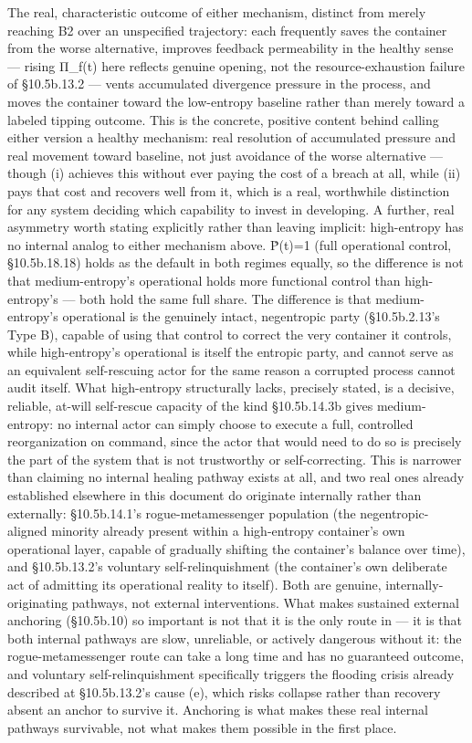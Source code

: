 \documentclass[
]{article}
\begin{document}
The real, characteristic outcome of either mechanism, distinct from
merely reaching B2 over an unspecified trajectory: each frequently saves
the container from the worse alternative, improves feedback permeability
in the healthy sense --- rising Π\_f(t) here reflects genuine opening,
not the resource-exhaustion failure of §10.5b.13.2 --- vents accumulated
divergence pressure in the process, and moves the container toward the
low-entropy baseline rather than merely toward a labeled tipping
outcome. This is the concrete, positive content behind calling either
version a healthy mechanism: real resolution of accumulated pressure and
real movement toward baseline, not just avoidance of the worse
alternative --- though (i) achieves this without ever paying the cost of
a breach at all, while (ii) pays that cost and recovers well from it,
which is a real, worthwhile distinction for any system deciding which
capability to invest in developing. A further, real asymmetry worth
stating explicitly rather than leaving implicit: high-entropy has no
internal analog to either mechanism above. Ṗ(t)=1 (full operational
control, §10.5b.18.18) holds as the default in both regimes equally, so
the difference is not that medium-entropy's operational holds more
functional control than high-entropy's --- both hold the same full
share. The difference is that medium-entropy's operational is the
genuinely intact, negentropic party (§10.5b.2.13's Type B), capable of
using that control to correct the very container it controls, while
high-entropy's operational is itself the entropic party, and cannot
serve as an equivalent self-rescuing actor for the same reason a
corrupted process cannot audit itself. What high-entropy structurally
lacks, precisely stated, is a decisive, reliable, at-will self-rescue
capacity of the kind §10.5b.14.3b gives medium-entropy: no internal
actor can simply choose to execute a full, controlled reorganization on
command, since the actor that would need to do so is precisely the part
of the system that is not trustworthy or self-correcting. This is
narrower than claiming no internal healing pathway exists at all, and
two real ones already established elsewhere in this document do
originate internally rather than externally: §10.5b.14.1's
rogue-metamessenger population (the negentropic-aligned minority already
present within a high-entropy container's own operational layer, capable
of gradually shifting the container's balance over time), and
§10.5b.13.2's voluntary self-relinquishment (the container's own
deliberate act of admitting its operational reality to itself). Both are
genuine, internally-originating pathways, not external interventions.
What makes sustained external anchoring (§10.5b.10) so important is not
that it is the only route in --- it is that both internal pathways are
slow, unreliable, or actively dangerous without it: the
rogue-metamessenger route can take a long time and has no guaranteed
outcome, and voluntary self-relinquishment specifically triggers the
flooding crisis already described at §10.5b.13.2's cause (e), which
risks collapse rather than recovery absent an anchor to survive it.
Anchoring is what makes these real internal pathways survivable, not
what makes them possible in the first place.
\end{document}
